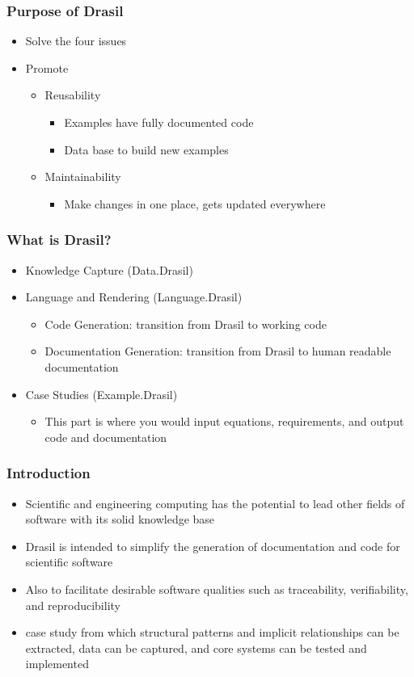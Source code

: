 \documentclass{beamer}
\begin{document}
\begin{frame}
\frametitle{Purpose of Drasil}
\begin{itemize}
  \item Solve the four issues
  \item Promote 
    \begin{itemize}
      \item Reusability 
        \begin{itemize}
          \item Examples have fully documented code
          \item Data base to build new examples
        \end{itemize}
      \item Maintainability
        \begin{itemize}
          \item Make changes in one place, gets updated everywhere
        \end{itemize}
    \end{itemize}
\end{itemize}
\end{frame}

\begin{frame}
\frametitle{What is Drasil?}
\begin{itemize}
  \item<1-> Knowledge Capture (Data.Drasil)
  \item<2-> Language and Rendering (Language.Drasil)
    \begin{itemize}
      \item Code Generation: transition from Drasil to working code
      \item Documentation Generation: transition from Drasil to human readable documentation
    \end{itemize}
  \item<3-> Case Studies (Example.Drasil)
    \begin{itemize}
      \item This part is where you would input equations, requirements, and output code and documentation
    \end{itemize}
\end{itemize}
\end{frame}

\begin{frame}
\frametitle{Introduction}
\begin{itemize}
 \item<1-> Scientific and engineering computing has the potential to lead other fields of software with its solid knowledge base
 \item<2-> Drasil is intended to simplify the generation of documentation and code for scientific software
 \item<3-> Also to facilitate desirable software qualities such as traceability, verifiability, and reproducibility
 \item<4-> case study from which structural patterns and implicit relationships can be extracted, data can be captured, and core systems can be tested and implemented
\end{itemize}
\end{frame}
\end{document}
